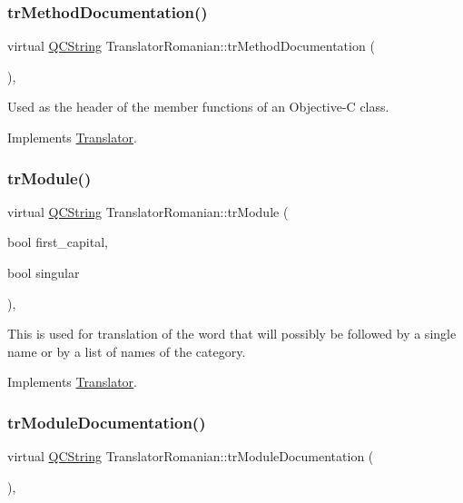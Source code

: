 \subsubsection{\texorpdfstring{trMethodDocumentation()}{trMethodDocumentation()}}
{\footnotesize\ttfamily virtual \mbox{\hyperlink{class_q_c_string}{Q\+C\+String}} Translator\+Romanian\+::tr\+Method\+Documentation (\begin{DoxyParamCaption}{ }\end{DoxyParamCaption})\hspace{0.3cm}{\ttfamily [inline]}, {\ttfamily [virtual]}}

Used as the header of the member functions of an Objective-\/C class. 

Implements \mbox{\hyperlink{class_translator}{Translator}}.

\mbox{\label{class_translator_romanian_a20002054853e975325f9836aa6a2d49b}} 
\subsubsection{\texorpdfstring{trModule()}{trModule()}}
{\footnotesize\ttfamily virtual \mbox{\hyperlink{class_q_c_string}{Q\+C\+String}} Translator\+Romanian\+::tr\+Module (\begin{DoxyParamCaption}\item[{bool}]{first\+\_\+capital,  }\item[{bool}]{singular }\end{DoxyParamCaption})\hspace{0.3cm}{\ttfamily [inline]}, {\ttfamily [virtual]}}

This is used for translation of the word that will possibly be followed by a single name or by a list of names of the category. 

Implements \mbox{\hyperlink{class_translator}{Translator}}.

\mbox{\label{class_translator_romanian_abc6405d0c8357ce8b4f5f746e5441db3}} 
\subsubsection{\texorpdfstring{trModuleDocumentation()}{trModuleDocumentation()}}
{\footnotesize\ttfamily virtual \mbox{\hyperlink{class_q_c_string}{Q\+C\+String}} Translator\+Romanian\+::tr\+Module\+Documentation (\begin{DoxyParamCaption}{ }\end{DoxyParamCaption})\hspace{0.3cm}{\ttfamily [inline]}, {\ttfamily [virtual]}}

